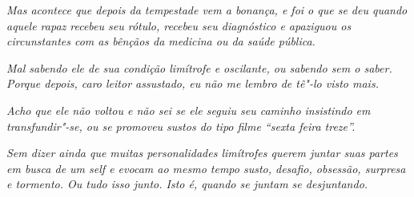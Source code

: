 \emph{Mas acontece que depois da tempestade vem a bonança, e foi o que
se deu quando aquele rapaz recebeu seu rótulo, recebeu seu diagnóstico e
apaziguou os circunstantes com as bênçãos da medicina ou da saúde
pública.}~

\emph{Mal sabendo ele de sua condição limítrofe e oscilante, ou sabendo
sem o saber. Porque depois, caro leitor assustado, eu não me lembro de
tê"-lo visto mais.}~

\emph{Acho que ele não voltou e não sei se ele seguiu seu caminho
insistindo em transfundir"-se, ou se promoveu sustos do tipo filme
``sexta feira treze''.}~

\emph{Sem dizer ainda que muitas personalidades limítrofes querem juntar
suas partes em busca de um self e evocam ao mesmo tempo susto, desafio,
obsessão, surpresa e tormento. Ou tudo isso junto. Isto é, quando se
juntam se desjuntando.}

 

